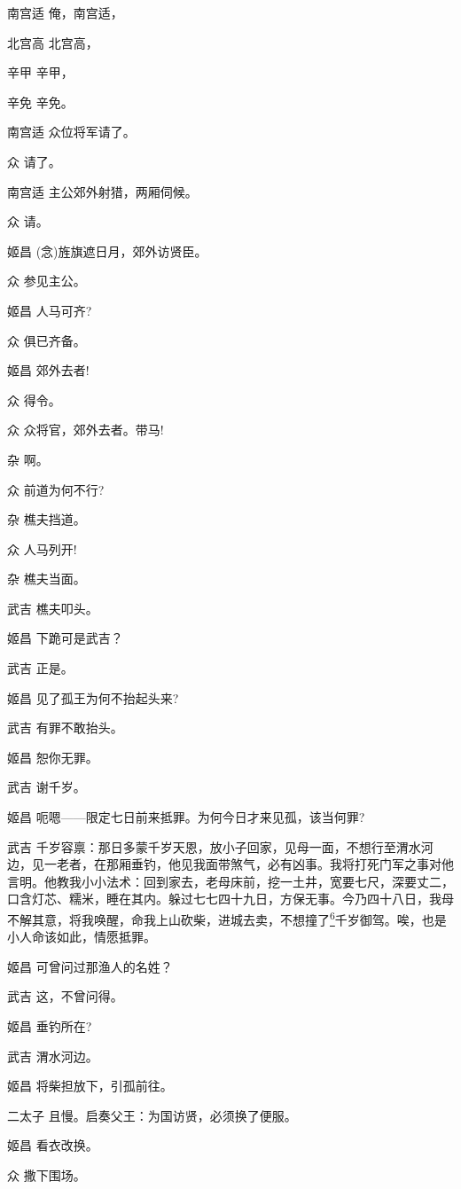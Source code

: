 {南宫适 俺，南宫适，

北宫高 北宫高，

辛甲 辛甲，

辛免 辛免。

南宫适 众位将军请了。

众 请了。

南宫适 主公郊外射猎，两厢伺候。

众 请。

姬昌 (念)旌旗遮日月，郊外访贤臣。

众 参见主公。

姬昌 人马可齐?

众 俱已齐备。

姬昌 郊外去者!

众 得令。

众 众将官，郊外去者。带马!

杂 啊。

众 前道为何不行?

杂 樵夫挡道。

众 人马列开!

杂 樵夫当面。

武吉 樵夫叩头。

姬昌 下跪可是武吉？

武吉 正是。

姬昌 见了孤王为何不抬起头来?

武吉 有罪不敢抬头。

姬昌 恕你无罪。

武吉 谢千岁。

姬昌 呃嗯------限定七日前来抵罪。为何今日才来见孤，该当何罪?

武吉
千岁容禀：那日多蒙千岁天恩，放小子回家，见母一面，不想行至渭水河边，见一老者，在那厢垂钓，他见我面带煞气，必有凶事。我将打死门军之事对他言明。他教我小小法术：回到家去，老母床前，挖一土井，宽要七尺，深要丈二，口含灯芯、糯米，睡在其内。躲过七七四十九日，方保无事。今乃四十八日，我母不解其意，将我唤醒，命我上山砍柴，进城去卖，不想撞了\protect\hyperlink{fn6}{\textsuperscript{6}}千岁御驾。唉，也是小人命该如此，情愿抵罪。

姬昌 可曾问过那渔人的名姓？

武吉 这，不曾问得。

姬昌 垂钓所在?

武吉 渭水河边。

姬昌 将柴担放下，引孤前往。

二太子 且慢。启奏父王：为国访贤，必须换了便服。

姬昌 看衣改换。

众 撒下围场。

}
